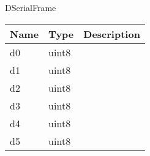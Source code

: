  {DSerialFrame}
\begin{tabular}[ht]{|l|l|p{8cm}|}
\hline
\textbf{Name} & \textbf{Type} & \textbf{Description}\\
\hline
d0 & uint8 & \\
\hline
d1 & uint8 & \\
\hline
d2 & uint8 & \\
\hline
d3 & uint8 & \\
\hline
d4 & uint8 & \\
\hline
d5 & uint8 & \\
\hline
\end{tabular}

